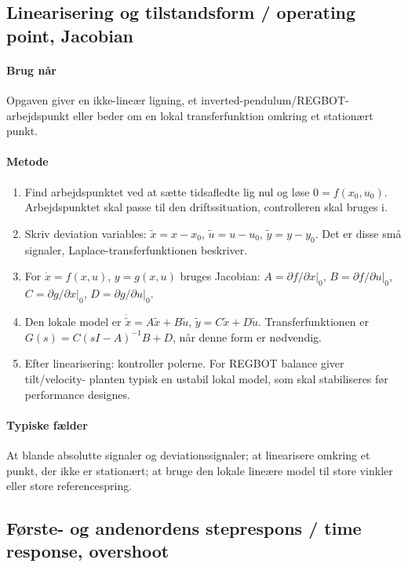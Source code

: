 \subsection{Linearisering og tilstandsform / operating point, Jacobian}
\label{sec:linearization}

\paragraph{Brug når}
Opgaven giver en ikke-lineær ligning, et inverted-pendulum/REGBOT-arbejdspunkt eller
beder om en lokal transferfunktion omkring et stationært punkt.

\paragraph{Metode}
\begin{enumerate}
\item Find arbejdspunktet ved at sætte tidsafledte lig nul og løse
      \(0=f(x_0,u_0)\). Arbejdspunktet skal passe til den driftssituation, controlleren
      skal bruges i.
\item Skriv deviation variables: \(\tilde x=x-x_0\), \(\tilde u=u-u_0\),
      \(\tilde y=y-y_0\). Det er disse små signaler, Laplace-transferfunktionen
      beskriver.
\item For \(\dot x=f(x,u)\), \(y=g(x,u)\) bruges Jacobian:
      \(A=\partial f/\partial x|_0\), \(B=\partial f/\partial u|_0\),
      \(C=\partial g/\partial x|_0\), \(D=\partial g/\partial u|_0\).
\item Den lokale model er \(\dot{\tilde x}=A\tilde x+B\tilde u\),
      \(\tilde y=C\tilde x+D\tilde u\). Transferfunktionen er
      \(G(s)=C(sI-A)^{-1}B+D\), når denne form er nødvendig.
\item Efter linearisering: kontroller polerne. For REGBOT balance giver tilt/velocity-
      planten typisk en ustabil lokal model, som skal stabiliseres før performance
      designes.
\end{enumerate}

\paragraph{Typiske fælder}
At blande absolutte signaler og deviationssignaler; at linearisere omkring et punkt,
der ikke er stationært; at bruge den lokale lineære model til store vinkler eller
store referencespring.

\subsection{Første- og andenordens steprespons / time response, overshoot}
\label{sec:time}

